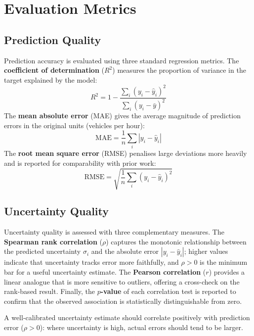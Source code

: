 \section{Evaluation Metrics}

\subsection{Prediction Quality}

Prediction accuracy is evaluated using three standard regression metrics. The \textbf{coefficient of determination} ($R^2$) measures the proportion of variance in the target explained by the model:
\begin{equation}
    R^2 = 1 - \frac{\sum_i (y_i - \hat{y}_i)^2}{\sum_i (y_i - \bar{y})^2}
\end{equation}
The \textbf{mean absolute error} (MAE) gives the average magnitude of prediction errors in the original units (vehicles per hour):
\begin{equation}
    \text{MAE} = \frac{1}{n}\sum_i |y_i - \hat{y}_i|
\end{equation}
The \textbf{root mean square error} (RMSE) penalises large deviations more heavily and is reported for comparability with prior work:
\begin{equation}
    \text{RMSE} = \sqrt{\frac{1}{n}\sum_i (y_i - \hat{y}_i)^2}
\end{equation}

\subsection{Uncertainty Quality}

Uncertainty quality is assessed with three complementary measures. The \textbf{Spearman rank correlation} ($\rho$) captures the monotonic relationship between the predicted uncertainty $\sigma_i$ and the absolute error $|y_i - \hat{y}_i|$; higher values indicate that uncertainty tracks error more faithfully, and $\rho > 0$ is the minimum bar for a useful uncertainty estimate. The \textbf{Pearson correlation} ($r$) provides a linear analogue that is more sensitive to outliers, offering a cross-check on the rank-based result. Finally, the \textbf{$p$-value} of each correlation test is reported to confirm that the observed association is statistically distinguishable from zero.

A well-calibrated uncertainty estimate should correlate positively with prediction error ($\rho > 0$): where uncertainty is high, actual errors should tend to be larger.

